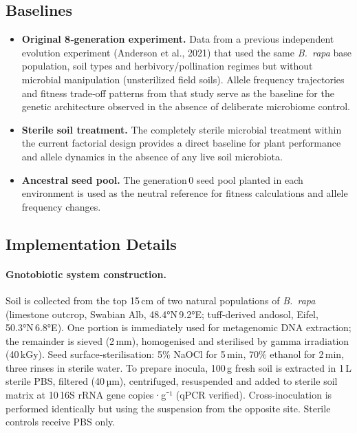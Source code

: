 \documentclass{article}
\begin{document}
\subsection{Baselines}
\begin{itemize}
  \item \textbf{Original 8‑generation experiment.} Data from a previous independent evolution experiment (Anderson et al., 2021) that used the same \textit{B.~rapa} base population, soil types and herbivory/pollination regimes but without microbial manipulation (unsterilized field soils). Allele frequency trajectories and fitness trade‑off patterns from that study serve as the baseline for the genetic architecture observed in the absence of deliberate microbiome control.
  \item \textbf{Sterile soil treatment.} The completely sterile microbial treatment within the current factorial design provides a direct baseline for plant performance and allele dynamics in the absence of any live soil microbiota.
  \item \textbf{Ancestral seed pool.} The generation 0 seed pool planted in each environment is used as the neutral reference for fitness calculations and allele frequency changes.
\end{itemize}

\subsection{Implementation Details}
\paragraph{Gnotobiotic system construction.} Soil is collected from the top 15 cm of two natural populations of \textit{B.~rapa} (limestone outcrop, Swabian Alb, 48.4°N 9.2°E; tuff-derived andosol, Eifel, 50.3°N 6.8°E). One portion is immediately used for metagenomic DNA extraction; the remainder is sieved (2 mm), homogenised and sterilised by gamma irradiation (40 kGy). Seed surface‑sterilisation: 5\% NaOCl for 5 min, 70\% ethanol for 2 min, three rinses in sterile water. To prepare inocula, 100 g fresh soil is extracted in 1 L sterile PBS, filtered (40 µm), centrifuged, resuspended and added to sterile soil matrix at 10\⁸ 16S rRNA gene copies·g⁻¹ (qPCR verified). Cross‑inoculation is performed identically but using the suspension from the opposite site. Sterile controls receive PBS only.
\end{document}
